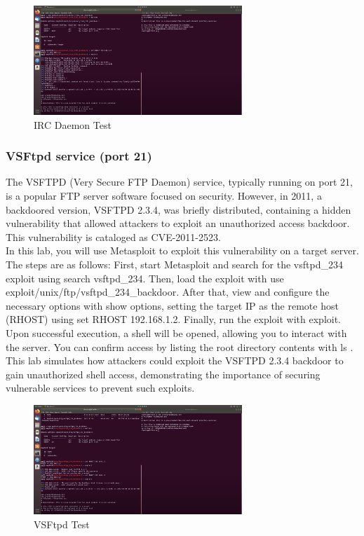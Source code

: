 \documentclass[a4paper,11pt]{article} %
\begin{document}
\begin{figure}[h!]
    \centering
    \includegraphics[width=0.7\textwidth]{images/10.png}
    \caption{IRC Daemon Test}
\end{figure}

\subsubsection{VSFtpd service (port 21)}
The VSFTPD (Very Secure FTP Daemon) service, typically running on port 21, is a popular FTP server software focused on security. However, in 2011, a backdoored version, VSFTPD 2.3.4, was briefly distributed, containing a hidden vulnerability that allowed attackers to exploit an unauthorized access backdoor. This vulnerability is cataloged as CVE-2011-2523.\\
In this lab, you will use Metasploit to exploit this vulnerability on a target server. The steps are as follows: First, start Metasploit and search for the vsftpd\_234 exploit using search vsftpd\_234. Then, load the exploit with use exploit/unix/ftp/vsftpd\_234\_backdoor. After that, view and configure the necessary options with show options, setting the target IP as the remote host (RHOST) using set RHOST 192.168.1.2. Finally, run the exploit with exploit.\\
Upon successful execution, a shell will be opened, allowing you to interact with the server. You can confirm access by listing the root directory contents with ls \/. This lab simulates how attackers could exploit the VSFTPD 2.3.4 backdoor to gain unauthorized shell access, demonstrating the importance of securing vulnerable services to prevent such exploits. 

\begin{figure}[h!]
    \centering
    \includegraphics[width=0.7\textwidth]{images/11.png}
    \caption{VSFtpd Test}
\end{figure}
\end{document}
